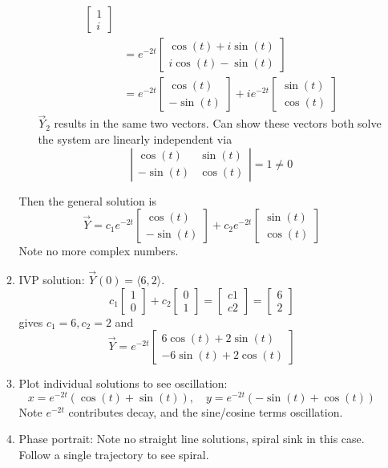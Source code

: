 \documentclass{article}
\begin{document}
\begin{enumerate}
\begin{enumerate}
\begin{itemize}
\begin{align*}
\begin{bmatrix}
1 \\ i
\end{bmatrix} \\
&= e^{-2t} 
\begin{bmatrix}
\cos(t)+i\sin(t) \\ i\cos(t)-\sin(t)
\end{bmatrix} \\
&= e^{-2t} 
\begin{bmatrix}
\cos(t) \\ -\sin(t)
\end{bmatrix} 
+ i e^{-2t} 
\begin{bmatrix}
\sin(t) \\ \cos(t)
\end{bmatrix} 
\end{align*}
$\vec{Y}_2$ results in the same two vectors. Can show these vectors both solve the system are linearly independent via
\[
\left |
\begin{array}{cc}
\cos(t) & \sin(t) \\
-\sin(t) & \cos(t)
\end{array} \right| 
= 1 \neq 0
\]
\end{itemize}
Then the general solution is
\[
\vec{Y} = c_1 e^{-2t} 
\begin{bmatrix}
\cos(t) \\ -\sin(t)
\end{bmatrix} 
+ c_2 e^{-2t} 
\begin{bmatrix}
\sin(t) \\ \cos(t)
\end{bmatrix}
\]
Note no more complex numbers.
\item IVP solution: $\vec{Y}(0) = \langle 6,2 \rangle$.
\[
c_1 
\begin{bmatrix}
1 \\ 0
\end{bmatrix}
+ c_2 
\begin{bmatrix}
0 \\ 1
\end{bmatrix}
= 
\begin{bmatrix}
c1 \\ c2
\end{bmatrix}
= \begin{bmatrix}
6 \\ 2
\end{bmatrix}
\]
gives $c_1=6, c_2=2$ and
\[
\vec{Y} = 
e^{-2t} \begin{bmatrix}
6\cos(t) + 2 \sin(t) \\
-6\sin(t)+2\cos(t)
\end{bmatrix}
\]
\item Plot individual solutions to see oscillation:
\[
x = e^{-2t}(\cos(t)+\sin(t)), \quad y = e^{-2t}(-\sin(t)+\cos(t))
\]
Note $e^{-2t}$ contributes decay, and the sine/cosine terms oscillation.
\item Phase portrait: Note no straight line solutions, spiral sink in this case. Follow a single trajectory to see spiral.
\end{enumerate}


\end{enumerate}
\end{document}
